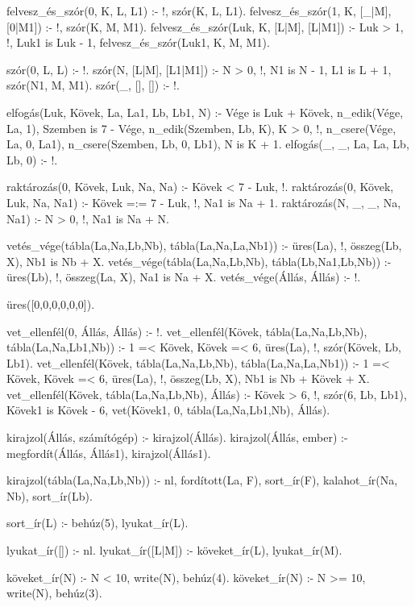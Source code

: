 \begin{program}
felvesz_és_szór(0, K, L, L1) :- %
    !, szór(K, L, L1).
felvesz_és_szór(1, K, [_|M], [0|M1]) :-
    !, szór(K, M, M1).
felvesz_és_szór(Luk, K, [L|M], [L|M1]) :-
    Luk > 1, !, Luk1 is Luk - 1,
    felvesz_és_szór(Luk1, K, M, M1).

szór(0, L, L) :- !.
szór(N, [L|M], [L1|M1]) :-
    N > 0, !,
    N1 is N - 1, L1 is L + 1,
    szór(N1, M, M1).
szór(_, [], []) :- !.

elfogás(Luk, Kövek, La, La1, Lb, Lb1, N) :-
    Vége is Luk + Kövek,
    n_edik(Vége, La, 1),
    Szemben is 7 - Vége,
    n_edik(Szemben, Lb, K),
    K > 0, !, %
    n_csere(Vége, La, 0, La1),
    n_csere(Szemben, Lb, 0, Lb1),
    N is K + 1.
elfogás(_, _, La, La, Lb, Lb, 0) :- !.

raktározás(0, Kövek, Luk, Na, Na) :-
    Kövek < 7 - Luk, !.
raktározás(0, Kövek, Luk, Na, Na1) :-
    Kövek =:= 7 - Luk, !, Na1 is Na + 1.
raktározás(N, _, _, Na, Na1) :-
    N > 0, !, Na1 is Na + N.

vetés_vége(tábla(La,Na,Lb,Nb),
           tábla(La,Na,La,Nb1)) :-
    üres(La), !, összeg(Lb, X), Nb1 is Nb + X.
vetés_vége(tábla(La,Na,Lb,Nb),
           tábla(Lb,Na1,Lb,Nb)) :-
    üres(Lb), !, összeg(La, X), Na1 is Na + X.
vetés_vége(Állás, Állás) :- !.

üres([0,0,0,0,0,0]).

vet_ellenfél(0, Állás, Állás) :- !.
vet_ellenfél(Kövek, tábla(La,Na,Lb,Nb),
             tábla(La,Na,Lb1,Nb)) :-
    1 =< Kövek, Kövek =< 6,
    \+ üres(La), !,
    szór(Kövek, Lb, Lb1).
vet_ellenfél(Kövek, tábla(La,Na,Lb,Nb),
             tábla(La,Na,La,Nb1)) :-
    1 =< Kövek, Kövek =< 6,
    üres(La), !,
    összeg(Lb, X), Nb1 is Nb + Kövek + X.
vet_ellenfél(Kövek, tábla(La,Na,Lb,Nb), Állás) :-
    Kövek > 6, !,
    szór(6, Lb, Lb1),
    Kövek1 is Kövek - 6,
    vet(Kövek1, 0, tábla(La,Na,Lb1,Nb), Állás).


kirajzol(Állás, számítógép) :- kirajzol(Állás).
kirajzol(Állás, ember) :-
    megfordít(Állás, Állás1),
    kirajzol(Állás1).

kirajzol(tábla(La,Na,Lb,Nb)) :-
    nl,
    fordított(La, F),
    sort_ír(F),
    kalahot_ír(Na, Nb),
    sort_ír(Lb).

sort_ír(L) :- behúz(5), lyukat_ír(L).

lyukat_ír([]) :- nl.
lyukat_ír([L|M]) :- köveket_ír(L), lyukat_ír(M).

köveket_ír(N) :- N < 10, write(N), behúz(4).
köveket_ír(N) :- N >= 10, write(N), behúz(3).


\end{program}
